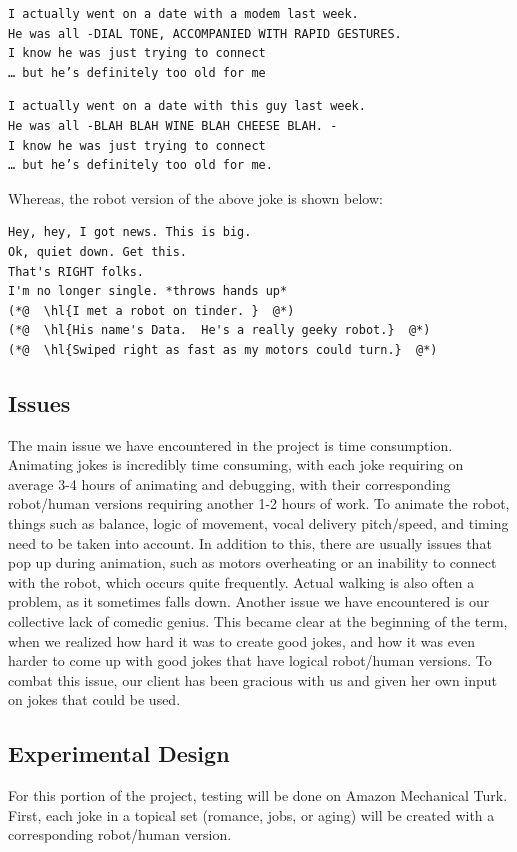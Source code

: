 \documentclass[onecolumn, draftclsnofoot,10pt, compsoc]{IEEEtran}
\begin{document}
\begin{lstlisting}
I actually went on a date with a modem last week.
He was all -DIAL TONE, ACCOMPANIED WITH RAPID GESTURES.
I know he was just trying to connect
… but he’s definitely too old for me
\end{lstlisting}

\begin{lstlisting}
I actually went on a date with this guy last week.
He was all -BLAH BLAH WINE BLAH CHEESE BLAH. -
I know he was just trying to connect
… but he’s definitely too old for me.
\end{lstlisting}



Whereas, the robot version of the above joke is shown below:

\begin{lstlisting}
Hey, hey, I got news. This is big.
Ok, quiet down. Get this.
That's RIGHT folks.
I'm no longer single. *throws hands up*
(*@  \hl{I met a robot on tinder. }  @*)
(*@  \hl{His name's Data.  He's a really geeky robot.}  @*)
(*@  \hl{Swiped right as fast as my motors could turn.}  @*)
\end{lstlisting}

\subsection{Issues}
The main issue we have encountered in the project is time consumption.
Animating jokes is incredibly time consuming, with each joke requiring on average 3-4 hours of animating and debugging, with their corresponding robot/human versions requiring another 1-2 hours of work. To animate the robot, things such as balance, logic of movement, vocal delivery pitch/speed, and timing need to be taken into account. In addition to this, there are usually issues that pop up during animation, such as motors overheating or an inability to connect with the robot, which occurs quite frequently. Actual walking is also often a problem, as it sometimes falls down.
Another issue we have encountered is our collective lack of comedic genius. This became clear at the beginning of the term, when we realized how hard it was to create good jokes, and how it was even harder to come up with good jokes that have logical robot/human versions. To combat this issue, our client has been gracious with us and given her own input on jokes that could be used.
\subsection{Experimental Design}
For this portion of the project, testing will be done on Amazon Mechanical Turk.
First, each joke in a topical set (romance, jobs, or aging) will be created with a corresponding robot/human version.
\end{document}
